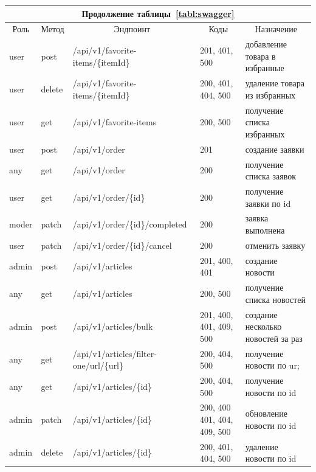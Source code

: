 \begin{table}
    \small
    \begin{tabular}{|p{1cm}|p{1cm}|p{8.5cm}|p{4.8cm}|p{8.5cm}|}
        \multicolumn{5}{c}{Продолжение таблицы~\ref{tabl:swagger}} \\
        \hline
        \multicolumn{1}{|c|}{Роль}
        & \multicolumn{1}{c|}{Метод}
        & \multicolumn{1}{c|}{Эндпоинт}
        & \multicolumn{1}{c|}{Коды}
        & \multicolumn{1}{c|}{Назначение}
        \\ \hline
        user & post & /api/v1/favorite-items/\{itemId\} & 201, 401, 500 & добавление товара в избранные \\ \hline 
        user & delete & /api/v1/favorite-items/\{itemId\} & 200, 401, 404, 500 & удаление товара из избранных \\ \hline 
        user & get & /api/v1/favorite-items & 200, 500 & получение списка избранных \\ \hline 
        user & post & /api/v1/order & 201 & создание заявки \\ \hline 
        any & get & /api/v1/order & 200 & получение списка заявок \\ \hline 
        user & get & /api/v1/order/\{id\} & 200 & получение заявки по id \\ \hline 
        moder & patch & /api/v1/order/\{id\}/completed & 200 & заявка выполнена \\ \hline 
        user & patch & /api/v1/order/\{id\}/cancel & 200 & отменить заявку \\ \hline 
        admin & post & /api/v1/articles & 201, 400, 401 & создание новости \\ \hline 
        any & get & /api/v1/articles & 200, 500 & получение списка новостей \\ \hline 
        admin & post & /api/v1/articles/bulk & 201, 400, 401, 409, 500 & создание несколько новостей за раз \\ \hline 
        any & get & /api/v1/articles/filter-one/url/\{url\} & 200, 404, 500 & получение новости по ur; \\ \hline 
        any & get & /api/v1/articles/\{id\} & 200, 404, 500 & получение новости по id \\ \hline 
        admin & patch & /api/v1/articles/\{id\} & 200, 400 401, 404, 409, 500 & обновление новости по id \\ \hline 
        admin & delete & /api/v1/articles/\{id\} & 200, 401, 404, 500 & удаление новости по id \\ \hline  

\end{tabular}
\end{table}

